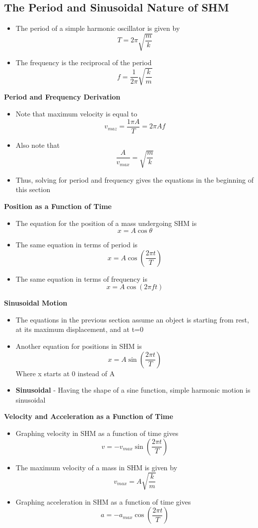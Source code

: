 \subsection{The Period and Sinusoidal Nature of SHM}
\begin{itemize}
    \item The period of a simple harmonic oscillator is given by \[T=2\pi\sqrt{\frac{m}{k}}\]
    \item The frequency is the reciprocal of the period \[f=\frac{1}{2\pi}\sqrt{\frac{k}{m}}\]
\end{itemize}

\textbf{Period and Frequency Derivation}
\begin{itemize}
    \item Note that maximum velocity is equal to \[v_{maz}=\frac{1\pi A}{T}=2\pi Af\]
    \item Also note that \[\frac{A}{v_{max}}=\sqrt{\frac{m}{k}}\]
    \item Thus, solving for period and frequency gives the equations in the beginning of this section
\end{itemize}

\textbf{Position as a Function of Time}
\begin{itemize}
    \item The equation for the position of a mass undergoing SHM is \[x=A\cos\theta\]
    \item The same equation in terms of period is \[x=A\cos(\frac{2\pi t}{T})\]
    \item The same equation in terms of frequency is \[x=A\cos(2\pi ft)\]
\end{itemize}

\textbf{Sinusoidal Motion}
\begin{itemize}
    \item The equations in the previous section assume an object is starting from rest, at its maximum displacement, and at t=0
    \item Another equation for positions in SHM is \[x=A\sin(\frac{2\pi t}{T})\] Where x starts at 0 instead of A
    \item \textbf{Sinusoidal} - Having the shape of a sine function, simple harmonic motion is sinusoidal
\end{itemize}

\textbf{Velocity and Acceleration as a Function of Time}
\begin{itemize}
    \item Graphing velocity in SHM as a function of time gives \[v=-v_{max}\sin(\frac{2\pi t}{T})\]
    \item The maximum velocity of a mass in SHM is given by \[v_{max}=A\sqrt{\frac{k}{m}}\]
    \item Graphing acceleration in SHM as a function of time gives \[a=-a_{max}\cos(\frac{2\pi t}{T})\]
\end{itemize}

